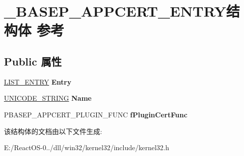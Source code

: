 \hypertarget{struct___b_a_s_e_p___a_p_p_c_e_r_t___e_n_t_r_y}{}\section{\+\_\+\+B\+A\+S\+E\+P\+\_\+\+A\+P\+P\+C\+E\+R\+T\+\_\+\+E\+N\+T\+R\+Y结构体 参考}
\label{struct___b_a_s_e_p___a_p_p_c_e_r_t___e_n_t_r_y}
\subsection*{Public 属性}
\begin{DoxyCompactItemize}
\item 
\mbox{\label{struct___b_a_s_e_p___a_p_p_c_e_r_t___e_n_t_r_y_a24b2bcb7fb655ec1caa7e6e97cc37036}} 
\hyperlink{struct___l_i_s_t___e_n_t_r_y}{L\+I\+S\+T\+\_\+\+E\+N\+T\+RY} {\bfseries Entry}
\item 
\mbox{\label{struct___b_a_s_e_p___a_p_p_c_e_r_t___e_n_t_r_y_a9c6f0761bc81acf1c03c3644cff573b4}} 
\hyperlink{struct___u_n_i_c_o_d_e___s_t_r_i_n_g}{U\+N\+I\+C\+O\+D\+E\+\_\+\+S\+T\+R\+I\+NG} {\bfseries Name}
\item 
\mbox{\label{struct___b_a_s_e_p___a_p_p_c_e_r_t___e_n_t_r_y_a9531e018fad90b5ca865a328075aeb14}} 
P\+B\+A\+S\+E\+P\+\_\+\+A\+P\+P\+C\+E\+R\+T\+\_\+\+P\+L\+U\+G\+I\+N\+\_\+\+F\+U\+NC {\bfseries f\+Plugin\+Cert\+Func}
\end{DoxyCompactItemize}


该结构体的文档由以下文件生成\+:\begin{DoxyCompactItemize}
\item 
E\+:/\+React\+O\+S-\/0../dll/win32/kernel32/include/kernel32.\+h\end{DoxyCompactItemize}
